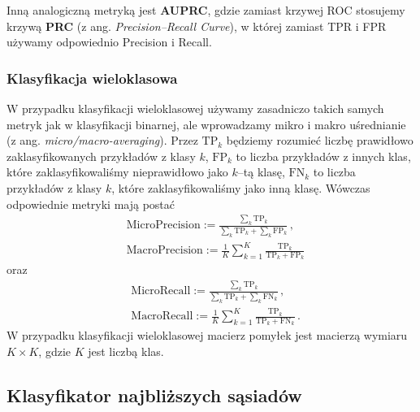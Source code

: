\documentclass{myclass}
\numberwithin{equation}{section}
\begin{document}
Inną analogiczną metryką jest \textbf{AUPRC}, gdzie zamiast krzywej ROC stosujemy krzywą
\textbf{PRC} (z ang. \textit{Precision--Recall Curve}), w której zamiast TPR i FPR używamy
odpowiednio Precision i Recall.


\subsubsection{Klasyfikacja wieloklasowa}

W przypadku klasyfikacji wieloklasowej używamy zasadniczo takich samych metryk jak w klasyfikacji
binarnej, ale wprowadzamy mikro i makro uśrednianie (z ang. \textit{micro/macro-averaging}). Przez
\(\mathrm{TP}_k\) będziemy rozumieć liczbę prawidłowo zaklasyfikowanych przykładów z klasy \(k\),
\(\mathrm{FP}_k\) to liczba przykładów z innych klas, które zaklasyfikowaliśmy nieprawidłowo jako
\(k\)--tą klasę, \(\mathrm{FN}_k\) to liczba przykładów z klasy \(k\), które zaklasyfikowaliśmy jako
inną klasę. Wówczas odpowiednie metryki mają postać
\begin{equation}
    \begin{split}
        &\mathrm{MicroPrecision} := \frac{\sum_{k} \mathrm{TP}_k}{\sum_{k} \mathrm{TP}_k + \sum_{k} \mathrm{FP}_k}\,,\\
        &\mathrm{MacroPrecision} := \frac{1}{K} \sum_{k=1}^K \frac{\mathrm{TP}_k}{\mathrm{TP}_k + \mathrm{FP}_k}
    \end{split}
\end{equation}
oraz
\begin{equation}
    \begin{split}
        &\mathrm{MicroRecall} := \frac{\sum_{k} \mathrm{TP}_k}{\sum_{k} \mathrm{TP}_k + \sum_{k} \mathrm{FN}_k}\,,\\
        &\mathrm{MacroRecall} := \frac{1}{K} \sum_{k=1}^K \frac{\mathrm{TP}_k}{\mathrm{TP}_k + \mathrm{FN}_k}\,.
    \end{split}
\end{equation}
W przypadku klasyfikacji wieloklasowej macierz pomyłek jest macierzą wymiaru \(K \times K\), gdzie
\(K\) jest liczbą klas.


\subsection{Klasyfikator najbliższych sąsiadów}
\end{document}
